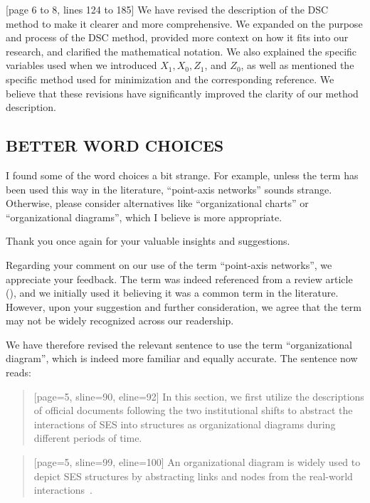 \AR{} [page 6 to 8, lines 124 to 185] We have revised the description of the DSC method to make it clearer and more comprehensive. We expanded on the purpose and process of the DSC method, provided more context on how it fits into our research, and clarified the mathematical notation. We also explained the specific variables used when we introduced $X_1, X_0, Z_1$, and $Z_0$, as well as mentioned the specific method used for minimization and the corresponding reference. We believe that these revisions have significantly improved the clarity of our method description.

\subsection{BETTER WORD CHOICES}\label{sec:1-2}

\RC{} I found some of the word choices a bit strange. For example, unless the term has been used this way in the literature, ``point-axis networks'' sounds strange. Otherwise, please consider alternatives like ``organizational charts'' or ``organizational diagrams'', which I believe is more appropriate.

\AR{} Thank you once again for your valuable insights and suggestions.

\AR*{} Regarding your comment on our use of the term ``point-axis networks'', we appreciate your feedback. The term was indeed referenced from a review article (\cite{kluger2020}), and we initially used it believing it was a common term in the literature. However, upon your suggestion and further consideration, we agree that the term may not be widely recognized across our readership.

\AR*{} We have therefore revised the relevant sentence to use the term ``organizational diagram'', which is indeed more familiar and equally accurate. The sentence now reads:

\begin{quote}[page=5, sline=90, eline=92]
    In this section, we first utilize the descriptions of official documents following the two institutional shifts to abstract the interactions of SES into structures as organizational diagrams during different periods of time.
\end{quote}

\begin{quote}[page=5, sline=99, eline=100]
    An organizational diagram is widely used to depict SES structures by abstracting links and nodes from the real-world interactions~\cite{wang2022g,bodin2017a,kluger2020,guerrero2015}.
\end{quote}

